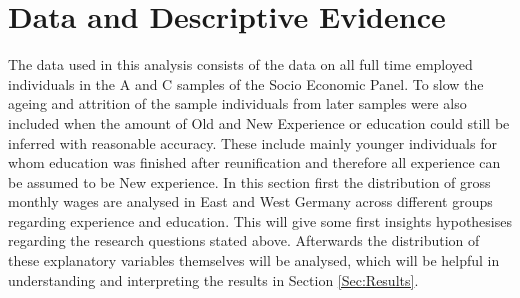 \section{Data and Descriptive Evidence} \label{Sec:Data}
The data used in this analysis consists of the data on all full time employed individuals in the A and C samples of the Socio Economic Panel. To slow the ageing and attrition of the sample individuals from later samples were also included when the amount of Old and New Experience or education could still be inferred with reasonable accuracy. These include mainly younger individuals for whom education was finished after reunification and therefore all experience can be assumed to be New experience. In this section first the distribution of gross monthly wages are analysed in East and West Germany across different groups regarding experience and education. This will give some first insights hypothesises regarding the research questions stated above. Afterwards the distribution of these explanatory variables themselves will be analysed, which will be helpful in understanding and interpreting the results in Section \ref{Sec:Results}.
